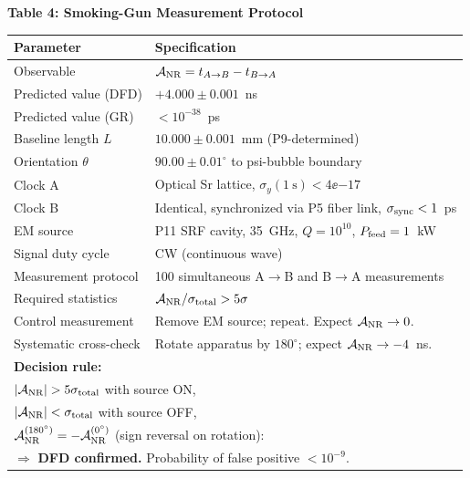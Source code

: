 \begin{center}
\textbf{Table 4: Smoking-Gun Measurement Protocol}
\vspace{0.5em}

\begin{tabular}{@{}lp{8cm}@{}}
\toprule
\textbf{Parameter} & \textbf{Specification} \\
\midrule
Observable & $\mathcal{A}_{\rm NR} = t_{A\to B} - t_{B\to A}$ \\
Predicted value (DFD) & $+4.000 \pm 0.001$~ns \\
Predicted value (GR)  & $<10^{-38}$~ps \\
Baseline length $L$   & $10.000 \pm 0.001$~mm (P9-determined) \\
Orientation $\theta$  & $90.00 \pm 0.01^\circ$ to psi-bubble boundary \\
Clock A & Optical Sr lattice, $\sigma_y(1~\text{s}) < 4\ee{-17}$ \\
Clock B & Identical, synchronized via P5 fiber link, $\sigma_{\rm sync} < 1$~ps \\
EM source & P11 SRF cavity, 35~GHz, $Q = 10^{10}$, $P_{\rm feed} = 1$~kW \\
Signal duty cycle & CW (continuous wave) \\
Measurement protocol & 100 simultaneous A$\to$B and B$\to$A measurements \\
Required statistics & $\mathcal{A}_{\rm NR} / \sigma_{\rm total} > 5\sigma$ \\
Control measurement & Remove EM source; repeat. Expect $\mathcal{A}_{\rm NR} \to 0$. \\
Systematic cross-check & Rotate apparatus by $180^\circ$; expect $\mathcal{A}_{\rm NR} \to -4$~ns. \\
\midrule
\multicolumn{2}{l}{\textbf{Decision rule:}} \\
\multicolumn{2}{l}{$|\mathcal{A}_{\rm NR}| > 5\sigma_{\rm total}$ with source ON,} \\
\multicolumn{2}{l}{$|\mathcal{A}_{\rm NR}| < \sigma_{\rm total}$ with source OFF,} \\
\multicolumn{2}{l}{$\mathcal{A}_{\rm NR}^{(180^\circ)} = -\mathcal{A}_{\rm NR}^{(0^\circ)}$ (sign reversal on rotation):} \\
\multicolumn{2}{l}{\quad $\Rightarrow$ \textbf{DFD confirmed.} Probability of false positive $< 10^{-9}$.} \\
\bottomrule
\end{tabular}
\end{center}

